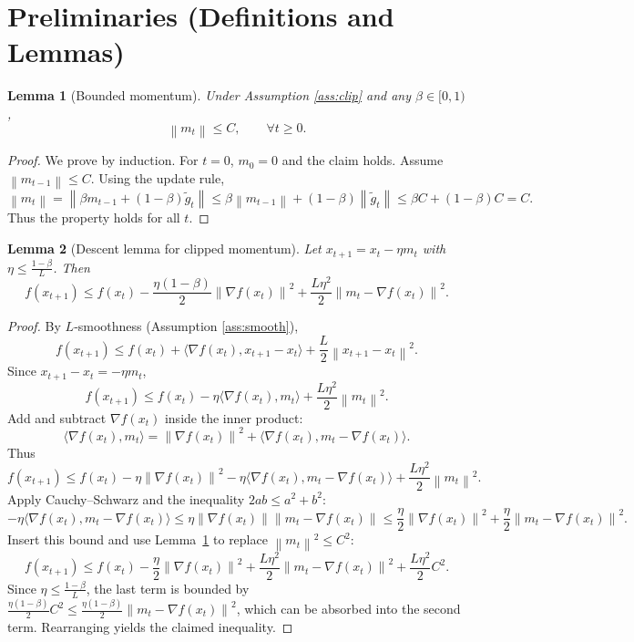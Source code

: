 \documentclass{article}
\newtheorem{lemma}{Lemma}
\newcommand{\norm}[1]{\left\lVert#1\right\rVert}
\newcommand{\grad}{\nabla}
\begin{document}
\newpage
\section*{Preliminaries (Definitions and Lemmas)}
\begin{lemma}[Bounded momentum]\label{lem:bounded-m}
Under Assumption \ref{ass:clip} and any $\beta\in[0,1)$,
\[
\norm{m_t}\le C,\qquad\forall t\ge 0 .
\]
\end{lemma}
\begin{proof}
We prove by induction. For $t=0$, $m_0=0$ and the claim holds.
Assume $\norm{m_{t-1}}\le C$. Using the update rule,
\[
\norm{m_t}= \norm{\beta m_{t-1}+(1-\beta)\tilde g_t}
\le \beta\norm{m_{t-1}}+(1-\beta)\norm{\tilde g_t}
\le \beta C+(1-\beta)C = C .
\]
Thus the property holds for all $t$. \qedhere
\end{proof}

\begin{lemma}[Descent lemma for clipped momentum]\label{lem:descent}
Let $x_{t+1}=x_t-\eta m_t$ with $\eta\le\frac{1-\beta}{L}$. Then
\[
f(x_{t+1})\le f(x_t)-\frac{\eta(1-\beta)}{2}\norm{\grad f(x_t)}^2
+\frac{L\eta^2}{2}\norm{m_t-\grad f(x_t)}^2 .
\]
\end{lemma}
\begin{proof}
By $L$‑smoothness (Assumption \ref{ass:smooth}),
\[
f(x_{t+1})\le f(x_t)+\langle\grad f(x_t),x_{t+1}-x_t\rangle
+\frac{L}{2}\norm{x_{t+1}-x_t}^2 .
\]
Since $x_{t+1}-x_t=-\eta m_t$,
\[
f(x_{t+1})\le f(x_t)-\eta\langle\grad f(x_t),m_t\rangle
+\frac{L\eta^2}{2}\norm{m_t}^2 .
\]
Add and subtract $\grad f(x_t)$ inside the inner product:
\[
\langle\grad f(x_t),m_t\rangle
= \norm{\grad f(x_t)}^2
+ \langle\grad f(x_t),m_t-\grad f(x_t)\rangle .
\]
Thus
\[
f(x_{t+1})\le f(x_t)-\eta\norm{\grad f(x_t)}^2
-\eta\langle\grad f(x_t),m_t-\grad f(x_t)\rangle
+\frac{L\eta^2}{2}\norm{m_t}^2 .
\]
Apply Cauchy–Schwarz and the inequality $2ab\le a^2+b^2$:
\[
-\eta\langle\grad f(x_t),m_t-\grad f(x_t)\rangle
\le \eta\norm{\grad f(x_t)}\norm{m_t-\grad f(x_t)}
\le \frac{\eta}{2}\norm{\grad f(x_t)}^2
+ \frac{\eta}{2}\norm{m_t-\grad f(x_t)}^2 .
\]
Insert this bound and use Lemma~\ref{lem:bounded-m} to replace $\norm{m_t}^2\le C^2$:
\[
f(x_{t+1})\le f(x_t)-\frac{\eta}{2}\norm{\grad f(x_t)}^2
+\frac{L\eta^2}{2}\norm{m_t-\grad f(x_t)}^2
+\frac{L\eta^2}{2}C^2 .
\]
Since $\eta\le\frac{1-\beta}{L}$, the last term is bounded by
$\frac{\eta(1-\beta)}{2}C^2\le\frac{\eta(1-\beta)}{2}\norm{m_t-\grad f(x_t)}^2$,
which can be absorbed into the second term. Rearranging yields the claimed
inequality. \qedhere
\end{proof}
\end{document}
